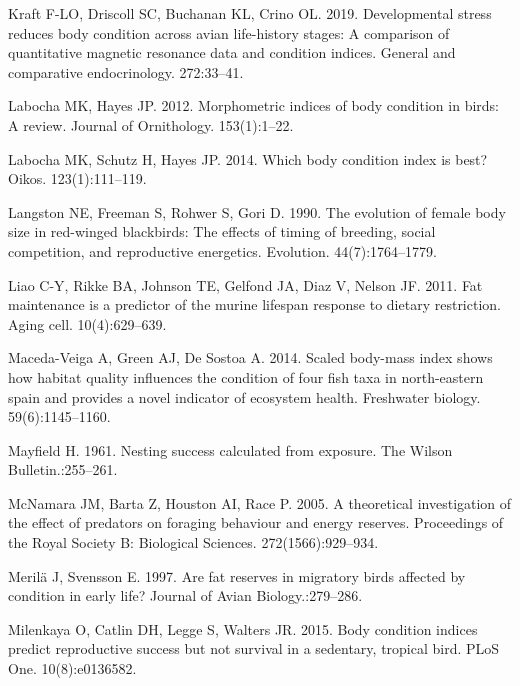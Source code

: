 \documentclass[
]{article}
\begin{document}
\leavevmode\hypertarget{ref-kraft2019developmental}{}%
Kraft F-LO, Driscoll SC, Buchanan KL, Crino OL. 2019. Developmental
stress reduces body condition across avian life-history stages: A
comparison of quantitative magnetic resonance data and condition
indices. General and comparative endocrinology. 272:33--41.

\leavevmode\hypertarget{ref-labocha2012morphometric}{}%
Labocha MK, Hayes JP. 2012. Morphometric indices of body condition in
birds: A review. Journal of Ornithology. 153(1):1--22.

\leavevmode\hypertarget{ref-labocha2014body}{}%
Labocha MK, Schutz H, Hayes JP. 2014. Which body condition index is
best? Oikos. 123(1):111--119.

\leavevmode\hypertarget{ref-langston1990evolution}{}%
Langston NE, Freeman S, Rohwer S, Gori D. 1990. The evolution of female
body size in red-winged blackbirds: The effects of timing of breeding,
social competition, and reproductive energetics. Evolution.
44(7):1764--1779.

\leavevmode\hypertarget{ref-liao2011fat}{}%
Liao C-Y, Rikke BA, Johnson TE, Gelfond JA, Diaz V, Nelson JF. 2011. Fat
maintenance is a predictor of the murine lifespan response to dietary
restriction. Aging cell. 10(4):629--639.

\leavevmode\hypertarget{ref-maceda2014scaled}{}%
Maceda-Veiga A, Green AJ, De Sostoa A. 2014. Scaled body-mass index
shows how habitat quality influences the condition of four fish taxa in
north-eastern spain and provides a novel indicator of ecosystem health.
Freshwater biology. 59(6):1145--1160.

\leavevmode\hypertarget{ref-mayfield1961nesting}{}%
Mayfield H. 1961. Nesting success calculated from exposure. The Wilson
Bulletin.:255--261.

\leavevmode\hypertarget{ref-mcnamara2005theoretical}{}%
McNamara JM, Barta Z, Houston AI, Race P. 2005. A theoretical
investigation of the effect of predators on foraging behaviour and
energy reserves. Proceedings of the Royal Society B: Biological
Sciences. 272(1566):929--934.

\leavevmode\hypertarget{ref-merila1997fat}{}%
Merilä J, Svensson E. 1997. Are fat reserves in migratory birds affected
by condition in early life? Journal of Avian Biology.:279--286.

\leavevmode\hypertarget{ref-milenkaya2015body}{}%
Milenkaya O, Catlin DH, Legge S, Walters JR. 2015. Body condition
indices predict reproductive success but not survival in a sedentary,
tropical bird. PLoS One. 10(8):e0136582.
\end{document}
